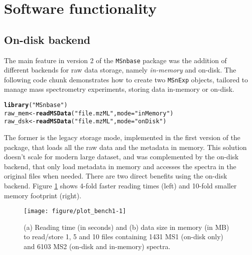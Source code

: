 \documentclass[journal=jacsat,manuscript=article]{achemso}\usepackage[]{graphicx}\usepackage[]{color}
\makeatletter
\newcommand{\hlstr}[1]{\textcolor[rgb]{0.192,0.494,0.8}{#1}}%
\newcommand{\hlstd}[1]{\textcolor[rgb]{0.345,0.345,0.345}{#1}}%
\newcommand{\hlkwb}[1]{\textcolor[rgb]{0.69,0.353,0.396}{#1}}%
\newcommand{\hlkwc}[1]{\textcolor[rgb]{0.333,0.667,0.333}{#1}}%
\newcommand{\hlkwd}[1]{\textcolor[rgb]{0.737,0.353,0.396}{\textbf{#1}}}%
\newenvironment{kframe}{%
 \def\at@end@of@kframe{}%
 \ifinner\ifhmode%
  \def\at@end@of@kframe{\end{minipage}}%
  \begin{minipage}{\columnwidth}%
 \fi\fi%
 \def\FrameCommand##1{\hskip\@totalleftmargin \hskip-\fboxsep
 \colorbox{shadecolor}{##1}\hskip-\fboxsep
     \hskip-\linewidth \hskip-\@totalleftmargin \hskip\columnwidth}%
 \MakeFramed {\advance\hsize-\width
   \@totalleftmargin\z@ \linewidth\hsize
   \@setminipage}}%
 {\par\unskip\endMakeFramed%
 \at@end@of@kframe}
\newenvironment{knitrout}{}{} %
\makeatother
\begin{document}
\section{Software functionality}


\subsection{On-disk backend}

The main feature in version 2 of the \texttt{MSnbase} package was the
addition of different backends for raw data storage, namely
\textit{in-memory} and on-disk. The following code chunk
demonstrates how to create two \texttt{MSnExp} objects, tailored to
manage mass spectrometry experiments, storing data in-memory or
on-disk.

\begin{knitrout}
\color{fgcolor}\begin{kframe}
\begin{alltt}
\hlkwd{library}\hlstd{(}\hlstr{"MSnbase"}\hlstd{)}
\hlstd{raw_mem} \hlkwb{<-} \hlkwd{readMSData}\hlstd{(}\hlstr{"file.mzML"}\hlstd{,} \hlkwc{mode} \hlstd{=} \hlstr{"inMemory"}\hlstd{)}
\hlstd{raw_dsk} \hlkwb{<-} \hlkwd{readMSData}\hlstd{(}\hlstr{"file.mzML"}\hlstd{,} \hlkwc{mode} \hlstd{=} \hlstr{"onDisk"}\hlstd{)}
\end{alltt}
\end{kframe}
\end{knitrout}

The former is the legacy storage mode, implemented in the first
version of the package, that loads all the raw data and the metadata
in memory. This solution doesn't scale for modern large dataset, and
was complemented by the on-disk backend, that only load metadata in
memory and accesses the spectra in the original files when
needed. There are two direct benefits using the on-disk
backend. Figure \ref{fig:bench1} shows 4-fold faster reading times
(left) and 10-fold smaller memory footprint (right).




\begin{figure}[ht]
  \centering
\begin{knitrout}
\color{fgcolor}
\texttt{[image: figure/plot\_bench1-1]} 

\end{knitrout}
\caption{(a) Reading time (in seconds) and (b) data size in memory (in
  MB) to read/store 1, 5 and 10 files containing 1431 MS1 (on-disk
  only) and 6103 MS2 (on-disk and in-memory) spectra. }
\label{fig:bench1}
\end{figure}
\end{document}
